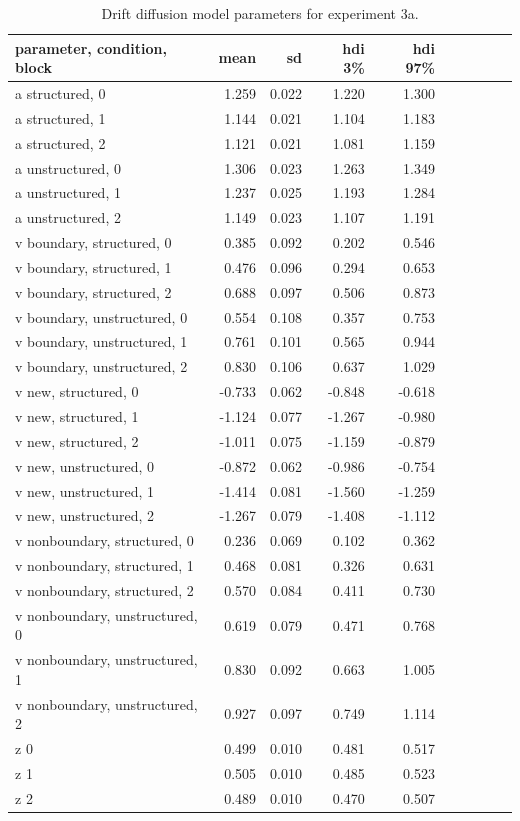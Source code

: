 \begin{table}[H]
    \centering
    \caption{Drift diffusion model parameters for experiment 3a.}
    \label{tab:exp3-ddm-params}
    \begin{tabular}{lrrrrrrrrr}
        \toprule
        parameter, condition, block & mean & sd & hdi 3\% & hdi 97\% \\
        \midrule
        a structured, 0 & 1.259 & 0.022 & 1.220 & 1.300 \\
        a structured, 1 & 1.144 & 0.021 & 1.104 & 1.183 \\
        a structured, 2 & 1.121 & 0.021 & 1.081 & 1.159 \\
        a unstructured, 0 & 1.306 & 0.023 & 1.263 & 1.349 \\
        a unstructured, 1 & 1.237 & 0.025 & 1.193 & 1.284 \\
        a unstructured, 2 & 1.149 & 0.023 & 1.107 & 1.191 \\
        v boundary, structured, 0 & 0.385 & 0.092 & 0.202 & 0.546 \\
        v boundary, structured, 1 & 0.476 & 0.096 & 0.294 & 0.653 \\
        v boundary, structured, 2 & 0.688 & 0.097 & 0.506 & 0.873 \\
        v boundary, unstructured, 0 & 0.554 & 0.108 & 0.357 & 0.753 \\
        v boundary, unstructured, 1 & 0.761 & 0.101 & 0.565 & 0.944 \\
        v boundary, unstructured, 2 & 0.830 & 0.106 & 0.637 & 1.029 \\
        v new, structured, 0 & -0.733 & 0.062 & -0.848 & -0.618 \\
        v new, structured, 1 & -1.124 & 0.077 & -1.267 & -0.980 \\
        v new, structured, 2 & -1.011 & 0.075 & -1.159 & -0.879 \\
        v new, unstructured, 0 & -0.872 & 0.062 & -0.986 & -0.754 \\
        v new, unstructured, 1 & -1.414 & 0.081 & -1.560 & -1.259 \\
        v new, unstructured, 2 & -1.267 & 0.079 & -1.408 & -1.112 \\
        v nonboundary, structured, 0 & 0.236 & 0.069 & 0.102 & 0.362 \\
        v nonboundary, structured, 1 & 0.468 & 0.081 & 0.326 & 0.631 \\
        v nonboundary, structured, 2 & 0.570 & 0.084 & 0.411 & 0.730 \\
        v nonboundary, unstructured, 0 & 0.619 & 0.079 & 0.471 & 0.768 \\
        v nonboundary, unstructured, 1 & 0.830 & 0.092 & 0.663 & 1.005 \\
        v nonboundary, unstructured, 2 & 0.927 & 0.097 & 0.749 & 1.114 \\
        z 0 & 0.499 & 0.010 & 0.481 & 0.517 \\
        z 1 & 0.505 & 0.010 & 0.485 & 0.523 \\
        z 2 & 0.489 & 0.010 & 0.470 & 0.507 \\
        \bottomrule
        \end{tabular}
        

\end{table}
